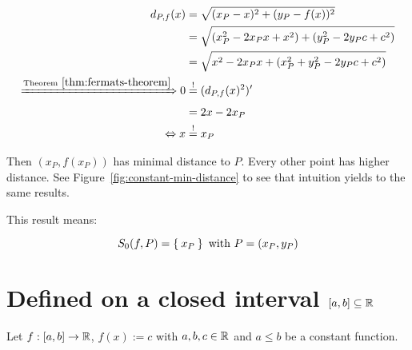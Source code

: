 \begin{align}
    d_{P,f}(x) &= \sqrt{(x_P - x)^2 + (y_P - f(x))^2}\\
               &= \sqrt{(x_P^2 - 2x_P x + x^2) + (y_P^2 - 2 y_P c + c^2)} \\
               &= \sqrt{x^2 - 2 x_P x + (x_P^2 + y_P^2 - 2 y_P c + c^2)}\label{eq:constant-function-distance}\\
 \xRightarrow{\text{Theorem}~\ref{thm:fermats-theorem}} 0 &\stackrel{!}{=} (d_{P,f}(x)^2)'\\
              &= 2x - 2x_P\\
  \Leftrightarrow x &\stackrel{!}{=} x_P
\end{align}

Then $(x_P,f(x_P))$ has
minimal distance to $P$. Every other point has higher distance.
See Figure~\ref{fig:constant-min-distance} to see that intuition
yields to the same results.

This result means:

\[S_0(f, P) = \Set{x_P} \text{ with } P = (x_P, y_P)\]
\clearpage

\section{Defined on a closed interval $[a,b] \subseteq \mathbb{R}$}
Let $f:[a,b] \rightarrow \mathbb{R}$, $f(x) := c$ with $a,b,c \in \mathbb{R}$ and 
$a \leq b$ be a constant function. 


